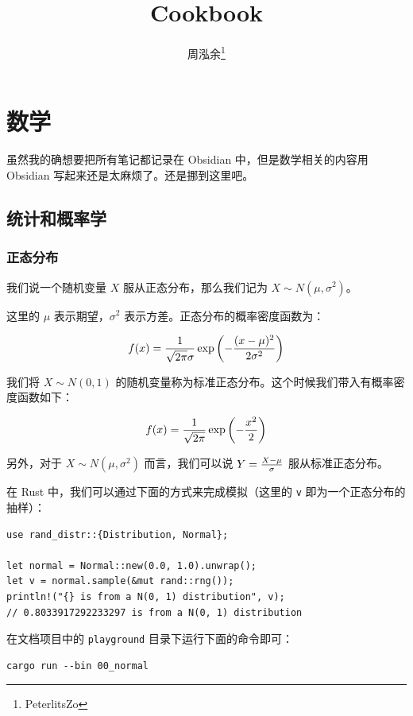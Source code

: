 \documentclass[utf8,a4paper,nofonts,9pt]{ctexbook}
\title{Cookbook}
\author{周泓余\thanks{PeterlitsZo}}
\begin{document}
\maketitle

\tableofcontents
\newpage

\chapter{数学}

虽然我的确想要把所有笔记都记录在 Obsidian 中，但是数学相关的内容用 Obsidian 写起来还是太麻烦了。还是挪到这里吧。

\section{统计和概率学}

\subsection{正态分布}

我们说一个随机变量 $X$ 服从正态分布，那么我们记为 $X \sim N(\mu, \sigma^2)$。

这里的 $\mu$ 表示期望，$\sigma^2$ 表示方差。正态分布的概率密度函数为：

$$
f(x) = {1 \over \sqrt{2\pi}\sigma} \exp\left(-{(x - \mu)^2 \over 2\sigma^2}\right)
$$

我们将 $X \sim N(0, 1)$ 的随机变量称为标准正态分布。这个时候我们带入有概率密度函数如下：

$$
f(x) = {1 \over \sqrt{2\pi}} \exp\left(-{x^2 \over 2}\right)
$$

另外，对于 $X \sim N(\mu, \sigma^2)$ 而言，我们可以说 $Y = {X - \mu \over \sigma}$ 服从标准正态分布。

在 Rust 中，我们可以通过下面的方式来完成模拟（这里的 \verb|v| 即为一个正态分布的抽样）：

\begin{lstlisting}
use rand_distr::{Distribution, Normal};

let normal = Normal::new(0.0, 1.0).unwrap();
let v = normal.sample(&mut rand::rng());
println!("{} is from a N(0, 1) distribution", v);
// 0.8033917292233297 is from a N(0, 1) distribution
\end{lstlisting}

在文档项目中的 \verb|playground| 目录下运行下面的命令即可：

\begin{lstlisting}
cargo run --bin 00_normal
\end{lstlisting}
\end{document}
